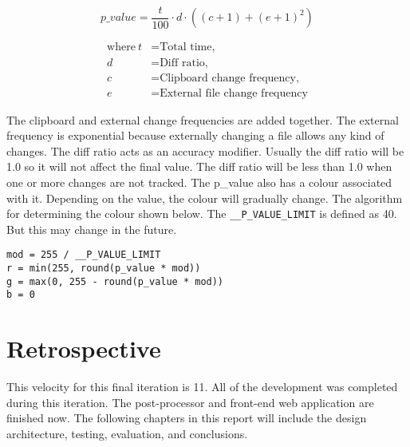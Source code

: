\[
  p\_value = \frac{t}{100} \cdot d \cdot ((c + 1) + (e + 1)^2)
\]

\begin{align*}
  \text{where}~t &= \text{Total time,} \\
  d &= \text{Diff ratio,} \\
  c &= \text{Clipboard change frequency,} \\
  e &= \text{External file change frequency}
\end{align*}

The clipboard and external change frequencies are added together. The external frequency is exponential because externally changing a file allows any kind of changes. The diff ratio acts as an accuracy modifier. Usually the diff ratio will be 1.0 so it will not affect the final value. The diff ratio will be less than 1.0 when one or more changes are not tracked. The p\_value also has a colour associated with it. Depending on the value, the colour will gradually change. The algorithm for determining the colour shown below. The \texttt{\_\_P\_VALUE\_LIMIT} is defined as 40. But this may change in the future.

\begin{lstlisting}[frame=single]
mod = 255 / __P_VALUE_LIMIT
r = min(255, round(p_value * mod))
g = max(0, 255 - round(p_value * mod))
b = 0
\end{lstlisting}

\section{Retrospective}
This velocity for this final iteration is 11. All of the development was completed during this iteration. The post-processor and front-end web application are finished now. The following chapters in this report will include the design architecture, testing, evaluation, and conclusions.
